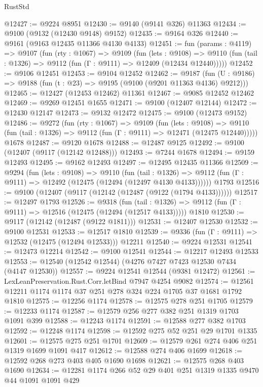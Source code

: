\begin{lexlean}{RustStd}
\begin{coremodule}
@12427 := @9224 @8951
@12430 := @9140 (@9141 @326) @11363
@12434 := @9100 (@9132 (@12430 @9148) @9152)
@12435 := @9164 @326
@12440 := @9161 (@9163 @12435 @11366 @4130 @4133)
@12451 := fun (params : @4119) =>
  @9107
    (fun (rty : @1067) =>
    @9109
      (fun (lets : @9108) =>
      @9110 (fun (tail : @1326) => @9112 (fun (Γ : @9111) => @12409 (@12434 @12440)))))
@12452 := @9106 @12451
@12453 := @9104 @12452
@12462 := @9187
    (fun (U : @9186) => @9188 (fun (t : @23) => @9195 (@9100 (@9201 @11363 @4136) @9212)))
@12465 := @12427 (@12453 @12462) @11361
@12467 := @9085 @12452 @12462
@12469 := @9269 @12451 @1655
@12471 := @9100 (@12407 @12144)
@12472 := @12430 @12147
@12473 := @9132 @12472
@12475 := @9100 (@12473 @9152)
@12486 := @9272
    (fun (rty : @1067) =>
    @9109
      (fun (lets : @9108) =>
      @9110 (fun (tail : @1326) => @9112 (fun (Γ : @9111) => @12471 (@12475 @12440)))))
    @1678
@12487 := @9120 @1678
@12488 := @12487 @9125
@12492 := @9100 (@12407 (@9117 (@12142 @12488)))
@12493 := @7244 @1678
@12494 := @9159 @12493
@12495 := @9162 @12493
@12497 := @12495 @12435 @11366
@12509 := @9294
    (fun (lets : @9108) =>
    @9110
      (fun (tail : @1326) =>
      @9112 (fun (Γ : @9111) => @12492 (@12475 (@12494 (@12497 @4130 @4133))))))
    @1793
@12516 := @9100 (@12407 (@9117 (@12142 (@12487 (@9122 (@1794 @4133))))))
@12517 := @12497 @1793
@12526 := @9318
    (fun (tail : @1326) => @9112 (fun (Γ : @9111) => @12516 (@12475 (@12494 (@12517 @4133)))))
    @1810
@12530 := @9117 (@12142 (@12487 (@9122 @1811)))
@12531 := @12407 @12530
@12532 := @9100 @12531
@12533 := @12517 @1810
@12539 := @9336 (fun (Γ : @9111) => @12532 (@12475 (@12494 @12533))) @12211
@12540 := @9224 @12531
@12541 := @12473 @12214
@12542 := @9100 @12541
@12544 := @12217 @12493 @12533
@12553 := @12540 (@12542 @12544) (@4276 @7427 @7423 @12530 @7434 (@4147 @12530))
@12557 := @9224 @12541 @12544 (@9381 @12472)
@12561 := LexLeanPreservation.Rust.Corr.letBind @7947 @4254 @9082
@12574 := @12561 @12211 @1174 @1174 @37 @251 @278 @324 @224 @1705 @37 @1681 @1792 @1810
@12575 := @12256 @1174
@12578 := @12575 @278 @251 @1705
@12579 := @12233 @1174
@12587 := @12579 @256 @277 @382 @251 @1319 @1703 @1091 @399
@12588 := @12243 @1174
@12591 := @12588 @277 @382 @1703
@12592 := @12248 @1174
@12598 := @12592 @275 @52 @251 @29 @1701 @1335
@12601 := @12575 @275 @251 @1701
@12609 := @12579 @261 @274 @406 @251 @1319 @1699 @1091 @417
@12612 := @12588 @274 @406 @1699
@12618 := @12592 @268 @273 @403 @405 @1690 @1698
@12621 := @12575 @268 @403 @1690
@12634 := @12281 @1174 @266 @52 @29 @401 @251 @1319 @1335 @9470 @44 @1091 @1091 @429

\end{coremodule}
\end{lexlean}

